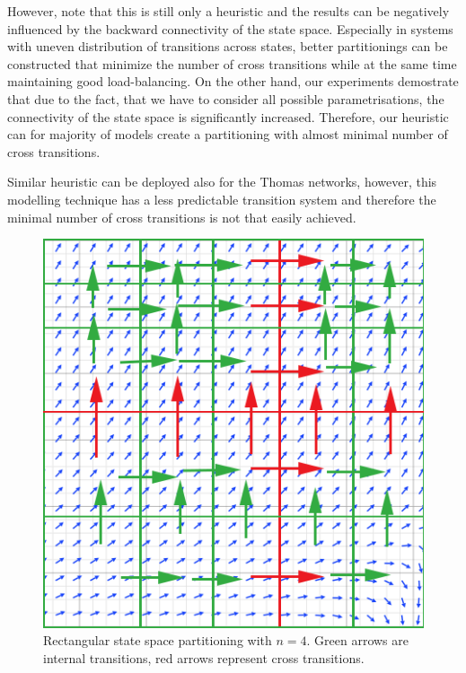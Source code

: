 \documentclass[12pt,oneside]{fithesis2}
\begin{document}
			However, note that this is still only a heuristic and the results can be negatively influenced by the backward connectivity of the state space. Especially in systems with uneven distribution of transitions across states, better partitionings can be constructed that minimize the number of cross transitions while at the same time maintaining good load-balancing. On the other hand, our experiments demostrate that due to the fact, that we have to consider all possible parametrisations, the connectivity of the state space is significantly increased. Therefore, our heuristic can for majority of models create a partitioning with almost minimal number of cross transitions. 
			
			Similar heuristic can be deployed also for the Thomas networks, however, this modelling technique has a less predictable transition system and therefore the minimal number of cross transitions is not that easily achieved. 
			

\begin{figure}
\begin{center}
\includegraphics[scale=.40]{trans.png}
\end{center}
\vspace*{-0.5em}
\caption{Rectangular state space partitioning with $n = 4$. Green arrows are internal transitions, red arrows represent cross transitions.}
\label{fig:3dresults}
\end{figure}			
		
\end{document}
